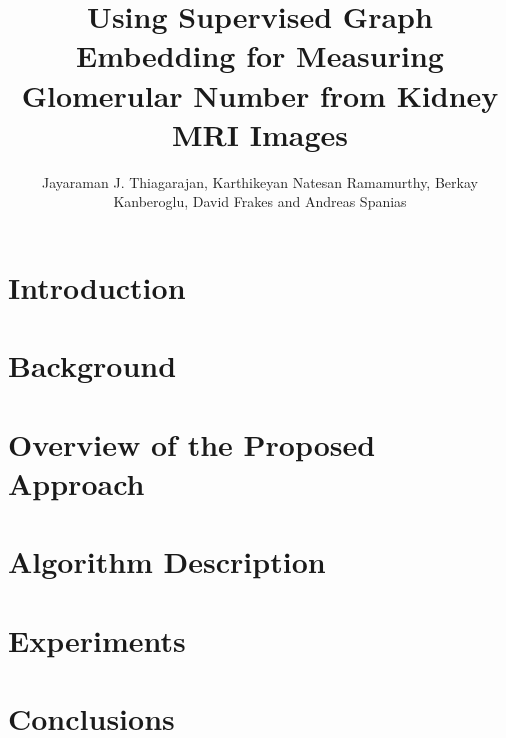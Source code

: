 \documentclass[journal]{IEEEtran}
\begin{document}
\title{Using Supervised Graph Embedding for Measuring Glomerular Number from Kidney MRI Images}
\author{Jayaraman J. Thiagarajan, Karthikeyan Natesan Ramamurthy, Berkay Kanberoglu, David Frakes and Andreas Spanias}
\date{}
\maketitle

\begin{abstract}
%
\end{abstract}


\section{Introduction}
\label{sec:prob}
%

\section{Background}
\label{sec:background}
%

\section{Overview of the Proposed Approach}
%

\section{Algorithm Description}
\label{sec:algo}
%

\section{Experiments}
\label{sec:experiments}
%


\section{Conclusions}
\label{sec:concl}


%
%
\end{document}
